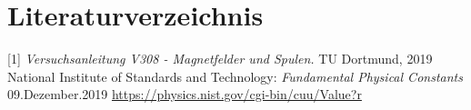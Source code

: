 \documentclass[titlepage = firstcover]{scrartcl}
\begin{document}
    \newpage
    \section{Literaturverzeichnis}
            [1] \textit{Versuchsanleitung V308 - Magnetfelder und Spulen.} TU Dortmund, 2019 \newline
            [2] National Institute of Standards and Technology: \textit{Fundamental Physical Constants} 09.Dezember.2019
                \url{https://physics.nist.gov/cgi-bin/cuu/Value?r}
\end{document}
